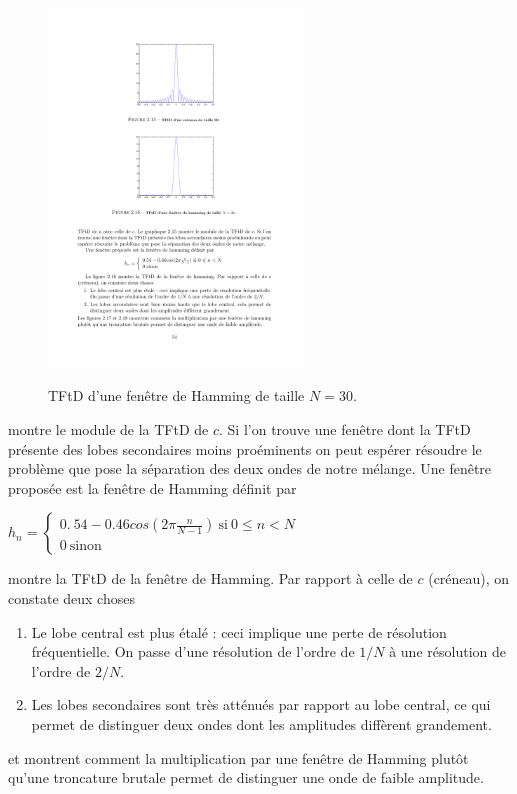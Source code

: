 \begin{definition}
\begin{figure}
  \centering
  \includegraphics[width=0.6\textwidth]{Figures/Figure2-16}\\
  \caption{TFtD d'une fen\^{e}tre de Hamming de taille $N=30.$}\label{fig:figure2-16}
\end{figure}
 montre le module de la TFtD de $c$. Si l'on trouve une fen\^{e}tre dont la TFtD pr\'{e}sente des lobes secondaires moins pro\'{e}minents on peut esp\'{e}rer r\'{e}soudre le probl\`{e}me que pose la s\'{e}paration des deux ondes de notre m\'{e}lange. Une fen\^{e}tre propos\'{e}e est la fen\^{e}tre de Hamming d\'{e}finit par

$h_{n}=\left\{\begin{array}{l}
0.\ 54-0.46cos(2\pi\frac{n}{N-1})\ \mathrm{s}\mathrm{i}\ 0\leq n<N\\
0\ \mathrm{s}\mathrm{i}\mathrm{n}\mathrm{o}\mathrm{n}
\end{array}\right.$

 montre la TFtD de la fen\^{e}tre de Hamming. 
Par rapport \`{a} celle de $c$ (cr\'{e}neau), on constate deux choses
\begin{enumerate}
\item Le lobe central est plus \'{e}tal\'{e} : ceci implique une perte de r\'{e}solution fr\'{e}quentielle. On passe d'une r\'{e}solution de l'ordre de $1/N$ \`{a} une r\'{e}solution de l'ordre de $2/N.$
\item Les lobes secondaires sont très atténués par rapport au  lobe central, ce qui permet de distinguer deux ondes dont les amplitudes diff\`{e}rent grandement.
\end{enumerate}
et   montrent comment la multiplication par une fen\^{e}tre de Hamming plut\^{o}t qu'une troncature brutale permet de distinguer une onde de faible amplitude.



\end{definition}
